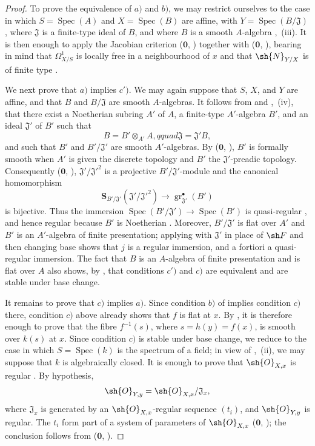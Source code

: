 \begin{proof}
To prove the equivalence of $a)$ and $b)$, we may restrict ourselves to the case in which $S=\operatorname{Spec}(A)$ and $X=\operatorname{Spec}(B)$ are affine, with
$Y=\operatorname{Spec}(B/\mathfrak J)$, where $\mathfrak J$ is a finite-type ideal of $B$, and where $B$ is a smooth $A$-algebra ,~(iii).
It is then enough to apply the Jacobian criterion ($\mathbf{0}$, ) together with ($\mathbf{0}$, ), bearing in mind that $\Omega^1_{X/S}$ is locally free in a neighbourhood of $x$ and that $\sh{N}_{Y/X}$ is of finite type .

We next prove that $a)$ implies $c')$.
We may again suppose that $S$, $X$, and $Y$ are affine, and that $B$ and $B/\mathfrak J$ are smooth $A$-algebras.
It follows from  and ,~(iv), that there exist a Noetherian subring $A'$ of $A$, a finite-type $A'$-algebra $B'$, and an ideal $\mathfrak J'$ of $B'$ such that
\[
  B=B'\otimes_{A'}A,qquad \mathfrak J=\mathfrak J'B,
\]
and such that $B'$ and $B'/\mathfrak J'$ are smooth $A'$-algebras.
By ($\mathbf{0}$, ), $B'$ is formally smooth when $A'$ is given the discrete topology and $B'$ the $\mathfrak J'$-preadic topology.
Consequently ($\mathbf{0}$, ), $\mathfrak J'/\mathfrak J'^2$ is a projective $B'/\mathfrak J'$-module and the canonical homomorphism
\[
  \mathbf{S}_{B'/\mathfrak J'}(\mathfrak J'/\mathfrak J'^2)
  \longrightarrow \operatorname{gr}^{\bullet}_{\mathfrak J'}(B')
\]
is bijective.
Thus the immersion $\operatorname{Spec}(B'/\mathfrak J')\to\operatorname{Spec}(B')$ is quasi-regular , and hence regular because $B'$ is Noetherian .
Moreover, $B'/\mathfrak J'$ is flat over $A'$  and $B'$ is an $A'$-algebra of finite presentation; applying  with $\mathfrak J'$ in place of $\sh F$ and then changing base shows that $j$ is a regular immersion, and a fortiori a quasi-regular immersion.
The fact that $B$ is an $A$-algebra of finite presentation and is flat over $A$ also shows, by , that conditions $c')$ and $c)$ are equivalent and are stable under base change.

It remains to prove that $c)$ implies $a)$.
Since condition $b)$ of  implies condition $c)$ there, condition $c)$ above already shows that $f$ is flat at $x$.
By , it is therefore enough to prove that the fibre $f^{-1}(s)$, where $s=h(y)=f(x)$, is smooth over $k(s)$ at $x$.
Since condition $c)$ is stable under base change, we reduce to the case in which $S=\operatorname{Spec}(k)$ is the spectrum of a field; in view of ,~(ii), we may suppose that $k$ is algebraically closed.
It is enough to prove that $\sh{O}_{X,x}$ is regular .
By hypothesis,
\[
  \sh{O}_{Y,y}=\sh{O}_{X,x}/\mathfrak J_x,
\]
where $\mathfrak J_x$ is generated by an $\sh{O}_{X,x}$-regular sequence $(t_i)$, and $\sh{O}_{Y,y}$ is regular.
The $t_i$ form part of a system of parameters of $\sh{O}_{X,x}$ ($\mathbf{0}$, ); the conclusion follows from ($\mathbf{0}$, ).
\end{proof}

